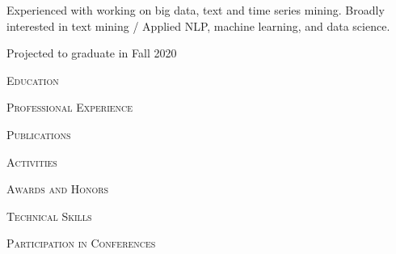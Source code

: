 \documentclass[a4paper]{article}
\newcommand{\lineunder} {\vspace*{-8pt} \\
    \hspace*{-18pt} \hrulefill \\
}
\newcommand{\header} [1] {{\hspace*{-18pt}\vspace*{6pt}\large {\textsc{#1}}}
    \vspace*{-6pt} %
}
\begin{document}

Experienced with working on big data, text and time series mining.
Broadly interested in text mining / Applied NLP, machine learning,
and data
science.


Projected to graduate in Fall 2020

\vspace{1em}
\header{Education}


%

\vspace{1em}
\header{Professional Experience}


\vspace{1em}
\header{Publications}


\vspace{1em}
\header{Activities}


\vspace{1em}
\header{Awards and Honors}


\vspace{1em}
\header{Technical Skills}


\vspace{1em}
\header{Participation in Conferences}



%

% 
% 
\end{document}
